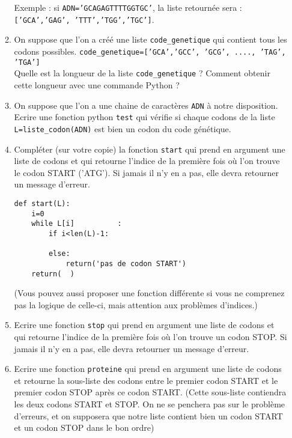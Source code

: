 \documentclass[a4paper, 11pt,reqno]{article}
\begin{document}
\begin{exercice}[Informatique]
\begin{enumerate}
\begin{enumerate}
Exemple : si \texttt{ADN='GCAGAGTTTTGGTGC'}, la liste retournée sera :
\texttt{['GCA','GAG', 'TTT','TGG','TGC']}.\\
 
 \item On suppose que l'on a  créé une liste \texttt{code\_genetique} qui contient tous les codons possibles. \texttt{code\_genetique=['GCA','GCC', 'GCG', ...., 'TAG', 'TGA']}\\
 
Quelle est la longueur de la liste \texttt{code\_genetique} ? Comment obtenir cette longueur avec une commande Python ? \\

\item On suppose que l'on a une chaine de caractères \texttt{ADN} à notre disposition. 
Ecrire une fonction python \texttt{test} qui vérifie si chaque codons de la liste \texttt{L=liste\_codon(ADN)} est bien un codon du code génétique. \\

\item Compléter (sur votre copie) la fonction \texttt{start} qui prend en argument une liste de codons et qui retourne  l'indice de la première fois où l'on trouve le codon START ('ATG'). Si jamais il n'y en a pas, elle devra retourner un message d'erreur. \\ 
\begin{lstlisting}
def start(L):
    i=0
    while L[i]          :
        if i<len(L)-1:
            
        else:
            return('pas de codon START')
    return(  )
\end{lstlisting}

(Vous pouvez aussi proposer une fonction différente si vous ne comprenez pas la logique de celle-ci, mais attention aux problèmes d'indices.) 

\item Ecrire une fonction \texttt{stop} qui prend en argument une liste de codons et qui retourne  l'indice de la première fois où l'on trouve un codon STOP. Si jamais il n'y en a pas, elle devra retourner un message d'erreur. \\

\item Ecrire une fonction \texttt{proteine} qui prend en argument une liste de codons et  retourne la sous-liste des codons entre   le premier codon START et le premier codon STOP après ce codon START.  (Cette sous-liste contiendra les deux codons START et STOP. On ne  se penchera pas sur le problème d'erreurs, et on supposera que  notre liste contient bien un codon START et un codon STOP dans le bon ordre)   \\
\end{enumerate}







\end{enumerate}
\end{exercice}
\end{document}
